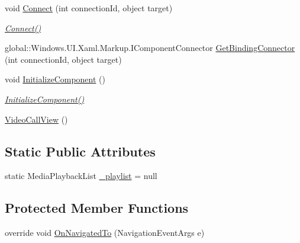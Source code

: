 \begin{DoxyCompactItemize}
void \hyperlink{class_e_l_i_client_1_1_video_call_view_1_1_video_call_view_a58984bc4c53e580e846c2d2afc500b01}{Connect} (int connection\+Id, object target)
\begin{DoxyCompactList}\small\item\em \hyperlink{class_e_l_i_client_1_1_video_call_view_1_1_video_call_view_a58984bc4c53e580e846c2d2afc500b01}{Connect()} \end{DoxyCompactList}\item 
global\+::\+Windows.\+U\+I.\+Xaml.\+Markup.\+I\+Component\+Connector \hyperlink{class_e_l_i_client_1_1_video_call_view_1_1_video_call_view_ae7097e1f8d74bc1af42c3023bda3cdb4}{Get\+Binding\+Connector} (int connection\+Id, object target)
\item 
void \hyperlink{class_e_l_i_client_1_1_video_call_view_1_1_video_call_view_a9c639cc5a9ea53e09963b60012149319}{Initialize\+Component} ()
\begin{DoxyCompactList}\small\item\em \hyperlink{class_e_l_i_client_1_1_video_call_view_1_1_video_call_view_a9c639cc5a9ea53e09963b60012149319}{Initialize\+Component()} \end{DoxyCompactList}\item 
\hyperlink{class_e_l_i_client_1_1_video_call_view_1_1_video_call_view_a995d034384b778ad0563c7b95a7fe0f5}{Video\+Call\+View} ()
\end{DoxyCompactItemize}
\subsection*{Static Public Attributes}
\begin{DoxyCompactItemize}
\item 
static Media\+Playback\+List \hyperlink{class_e_l_i_client_1_1_video_call_view_1_1_video_call_view_ac7804ca40c1b52e0a9987f7344b06109}{\+\_\+playlist} = null
\end{DoxyCompactItemize}
\subsection*{Protected Member Functions}
\begin{DoxyCompactItemize}
\item 
override void \hyperlink{class_e_l_i_client_1_1_video_call_view_1_1_video_call_view_a15a433bd1392e3005c84e7d6856f6384}{On\+Navigated\+To} (Navigation\+Event\+Args e)
\end{DoxyCompactItemize}

